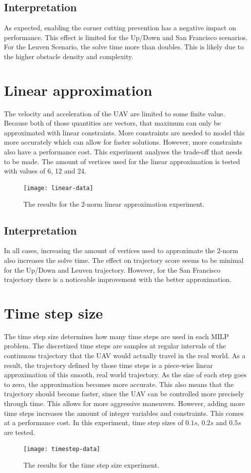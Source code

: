 \subsection{Interpretation}
As expected, enabling the corner cutting prevention has a negative impact on performance. This effect is limited for the Up/Down and San  Francisco scenarios. For the Leuven Scenario, the solve time more than doubles. This is likely due to the higher obstacle density and complexity.


\clearpage
\section{Linear approximation}
\label{subsec:lin-approx}
The velocity and acceleration of the UAV are limited to some finite value. Because both of those quantities are vectors, that maximum can only be approximated with linear constraints. More constraints are needed to model this more accurately which can allow for faster solutions. However, more constraints also have a performance cost. This experiment analyses the trade-off that needs to be made. The amount of vertices used for the linear approximation is tested with values of 6, 12 and 24.
\begin{figure}[]
	\centering
	\texttt{[image: linear-data]}
	\caption{The results for the 2-norm linear approximation experiment.}
	\label{fig:linear-approx-data}
\end{figure}



\subsection{Interpretation}
In all cases, increasing the amount of vertices used to approximate the 2-norm also increases the solve time. The effect on trajectory score seems to be minimal for the Up/Down and Leuven trajectory. However, for the San Francisco trajectory there is a noticeable improvement with the better approximation.

\clearpage
\section{Time step size}
\label{subsec:timestep}
The time step size determines how many time steps are used in each MILP problem. The discretized time steps are samples at regular intervals of the continuous trajectory that the UAV would actually travel in the real world. As a result, the trajectory defined by those time steps is a piece-wise linear approximation of this smooth, real world trajectory. As the size of each step goes to zero, the approximation becomes more accurate. This also means that the trajectory should become faster, since the UAV can be controlled more precisely through time. This allows for more aggressive maneuvers. 
However, adding more time steps increases the amount of integer variables and constraints. This comes at a performance cost.
In this experiment, time step sizes of $0.1s$, $0.2s$ and $0.5s$ are tested.
\begin{figure}[]
	\centering
	\texttt{[image: timestep-data]}
	\caption{The results for the time step size experiment.}
	\label{fig:timestep-data}
\end{figure}
